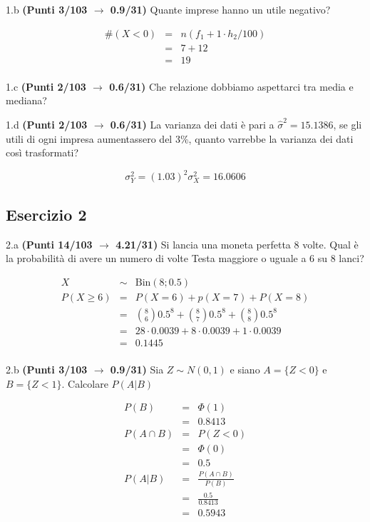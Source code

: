 \documentclass[
  11pt,
]{book}
\theoremstyle{mytheoremstyle}
\theoremstyle{mydefstyle}
\newenvironment{sol}
  {
  \begin{tcolorbox}[enhanced,breakable,arc=0.1mm,boxrule=1pt,colback=white,colframe=iblue,
  title=\bf \fontfamily{lmss}\selectfont \hspace{.5 cm} Soluzione,drop fuzzy shadow]

}{
\end{tcolorbox}
  }
\begin{document}
1.b \textbf{(Punti 3/103 \(\rightarrow\) 0.9/31)} Quante imprese hanno un utile negativo?

\begin{sol}
\begin{eqnarray*}
  \#(X<0) &=&  n (f_1 + 1\cdot h_2/100)\\
  &=& 7 + 12\\
  &=& 19\\
\end{eqnarray*}

\end{sol}

1.c \textbf{(Punti 2/103 \(\rightarrow\) 0.6/31)} Che relazione dobbiamo aspettarci tra media e mediana?

1.d \textbf{(Punti 2/103 \(\rightarrow\) 0.6/31)} La varianza dei dati è pari a \(\hat\sigma^2=15.1386\), se gli utili di ogni impresa aumentassero del 3\%, quanto varrebbe la varianza dei dati così trasformati?

\begin{sol}
\[\sigma_Y^2=(1.03)^2\sigma_X^2=16.0606\]

\end{sol}

\subsection{Esercizio 2}\label{esercizio-2-25}

2.a \textbf{(Punti 14/103 \(\rightarrow\) 4.21/31)} Si lancia una moneta perfetta 8 volte. Qual è la probabilità di avere un numero di volte Testa maggiore o uguale a 6 su 8 lanci?

\begin{sol}
\begin{eqnarray*}
  X &\sim&\text{Bin}(8;0.5)\\
  P(X\ge 6) &=& P(X=6)+p(X=7)+P(X=8)\\
  &=& \binom{8}{6} 0.5^8 + \binom{8}{7} 0.5^8 +\binom{8}{8} 0.5^8\\
  &=& 28\cdot 0.0039 + 8\cdot 0.0039 + 1\cdot 0.0039 \\
  &=& 0.1445 \\
\end{eqnarray*}

\end{sol}

2.b \textbf{(Punti 3/103 \(\rightarrow\) 0.9/31)} Sia \(Z\sim N(0,1)\) e siano \(A=\{Z<0\}\) e \(B=\{Z<1\}\). Calcolare \(P(A|B)\)

\begin{sol}
\begin{eqnarray*}
  P(B) &=&  \Phi(1)\\
  &=& 0.8413\\
  P(A\cap B) &=& P(Z<0)\\
  &=& \Phi(0)\\
  &=& 0.5\\
  P(A|B) &=& \frac{P(A\cap B)}{P(B)}\\
  &=& \frac{0.5}{0.8413}\\
  &=& 0.5943
\end{eqnarray*}

\end{sol}
\end{document}
